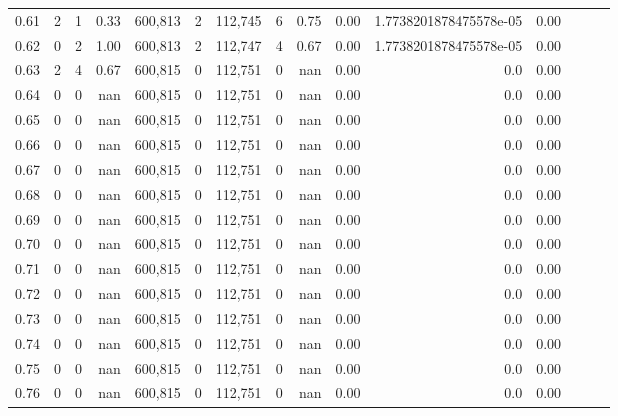 \begin{tabular}{rrrrrrrrrrrrrrr}
0.61 &       2 &      1 &  0.33 &  600,813 &        2 &  112,745 &        6 &  0.75 &  0.00 &  1.7738201878475578e-05 &      0.00 \\
0.62 &       0 &      2 &  1.00 &  600,813 &        2 &  112,747 &        4 &  0.67 &  0.00 &  1.7738201878475578e-05 &      0.00 \\
0.63 &       2 &      4 &  0.67 &  600,815 &        0 &  112,751 &        0 &   nan &  0.00 &                     0.0 &      0.00 \\
0.64 &       0 &      0 &   nan &  600,815 &        0 &  112,751 &        0 &   nan &  0.00 &                     0.0 &      0.00 \\
0.65 &       0 &      0 &   nan &  600,815 &        0 &  112,751 &        0 &   nan &  0.00 &                     0.0 &      0.00 \\
0.66 &       0 &      0 &   nan &  600,815 &        0 &  112,751 &        0 &   nan &  0.00 &                     0.0 &      0.00 \\
0.67 &       0 &      0 &   nan &  600,815 &        0 &  112,751 &        0 &   nan &  0.00 &                     0.0 &      0.00 \\
0.68 &       0 &      0 &   nan &  600,815 &        0 &  112,751 &        0 &   nan &  0.00 &                     0.0 &      0.00 \\
0.69 &       0 &      0 &   nan &  600,815 &        0 &  112,751 &        0 &   nan &  0.00 &                     0.0 &      0.00 \\
0.70 &       0 &      0 &   nan &  600,815 &        0 &  112,751 &        0 &   nan &  0.00 &                     0.0 &      0.00 \\
0.71 &       0 &      0 &   nan &  600,815 &        0 &  112,751 &        0 &   nan &  0.00 &                     0.0 &      0.00 \\
0.72 &       0 &      0 &   nan &  600,815 &        0 &  112,751 &        0 &   nan &  0.00 &                     0.0 &      0.00 \\
0.73 &       0 &      0 &   nan &  600,815 &        0 &  112,751 &        0 &   nan &  0.00 &                     0.0 &      0.00 \\
0.74 &       0 &      0 &   nan &  600,815 &        0 &  112,751 &        0 &   nan &  0.00 &                     0.0 &      0.00 \\
0.75 &       0 &      0 &   nan &  600,815 &        0 &  112,751 &        0 &   nan &  0.00 &                     0.0 &      0.00 \\
0.76 &       0 &      0 &   nan &  600,815 &        0 &  112,751 &        0 &   nan &  0.00 &                     0.0 &      0.00 \\

\end{tabular}
